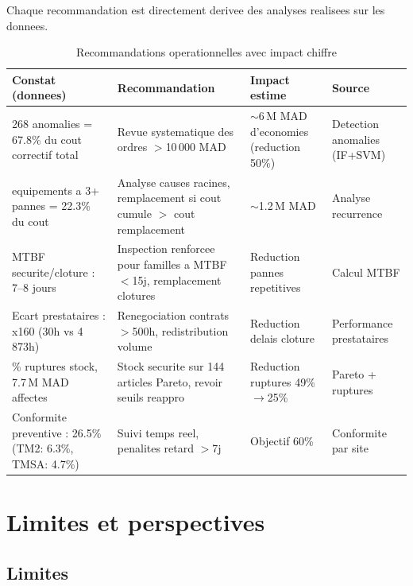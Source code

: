 \documentclass[12pt,a4paper]{article}
\begin{document}
Chaque recommandation est directement derivee des analyses realisees sur les donnees.

\begin{table}[H]
\centering
\small
\begin{tabular}{p{4cm}p{4.5cm}p{2.5cm}p{3cm}}
\toprule
\textbf{Constat (donnees)} & \textbf{Recommandation} & \textbf{Impact estime} & \textbf{Source} \\
\midrule
268 anomalies = 67.8\% du cout correctif total & Revue systematique des ordres $>$10\,000 MAD & $\sim$6\,M MAD d'economies (reduction 50\%) & Detection anomalies (IF+SVM) \\
\addlinespace
81 equipements a 3+ pannes = 22.3\% du cout & Analyse causes racines, remplacement si cout cumule $>$ cout remplacement & $\sim$1.2\,M MAD & Analyse recurrence \\
\addlinespace
MTBF securite/cloture : 7--8 jours & Inspection renforcee pour familles a MTBF $<$15j, remplacement clotures & Reduction pannes repetitives & Calcul MTBF \\
\addlinespace
Ecart prestataires : x160 (30h vs 4\,873h) & Renegociation contrats $>$500h, redistribution volume & Reduction delais cloture & Performance prestataires \\
\addlinespace
49\% ruptures stock, 7.7\,M MAD affectes & Stock securite sur 144 articles Pareto, revoir seuils reappro & Reduction ruptures 49\%$\rightarrow$25\% & Pareto + ruptures \\
\addlinespace
Conformite preventive : 26.5\% (TM2: 6.3\%, TMSA: 4.7\%) & Suivi temps reel, penalites retard $>$7j & Objectif 60\% & Conformite par site \\
\bottomrule
\end{tabular}
\caption{Recommandations operationnelles avec impact chiffre}
\end{table}

\section{Limites et perspectives}

\subsection{Limites}
\end{document}
